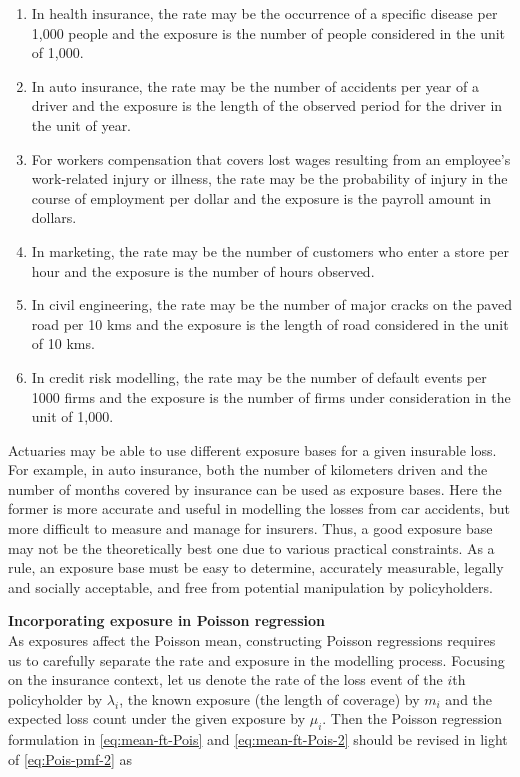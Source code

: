 \documentclass[]{book}
\providecommand{\tightlist}{%
  \setlength{\itemsep}{0pt}\setlength{\parskip}{0pt}}
\theoremstyle{definition}
\theoremstyle{definition}
\theoremstyle{definition}
\theoremstyle{remark}
\begin{document}
\begin{enumerate}
\def\labelenumi{\arabic{enumi}.}
\tightlist
\item
  In health insurance, the rate may be the occurrence of a specific
  disease per 1,000 people and the exposure is the number of people
  considered in the unit of 1,000.
\item
  In auto insurance, the rate may be the number of accidents per year of
  a driver and the exposure is the length of the observed period for the
  driver in the unit of year.\\
\item
  For workers compensation that covers lost wages resulting from an
  employee's work-related injury or illness, the rate may be the
  probability of injury in the course of employment per dollar and the
  exposure is the payroll amount in dollars.
\item
  In marketing, the rate may be the number of customers who enter a
  store per hour and the exposure is the number of hours observed.\\
\item
  In civil engineering, the rate may be the number of major cracks on
  the paved road per 10 kms and the exposure is the length of road
  considered in the unit of 10 kms.\\
\item
  In credit risk modelling, the rate may be the number of default events
  per 1000 firms and the exposure is the number of firms under
  consideration in the unit of 1,000.
\end{enumerate}

Actuaries may be able to use different exposure bases for a given
insurable loss. For example, in auto insurance, both the number of
kilometers driven and the number of months covered by insurance can be
used as exposure bases. Here the former is more accurate and useful in
modelling the losses from car accidents, but more difficult to measure
and manage for insurers. Thus, a good exposure base may not be the
theoretically best one due to various practical constraints. As a rule,
an exposure base must be easy to determine, accurately measurable,
legally and socially acceptable, and free from potential manipulation by
policyholders.

\textbf{Incorporating exposure in Poisson regression}\\
As exposures affect the Poisson mean, constructing Poisson regressions
requires us to carefully separate the rate and exposure in the modelling
process. Focusing on the insurance context, let us denote the rate of
the loss event of the \(i\)th policyholder by \(\lambda_i\), the known
exposure (the length of coverage) by \(m_i\) and the expected loss count
under the given exposure by \(\mu_i\). Then the Poisson regression
formulation in \eqref{eq:mean-ft-Pois} and \eqref{eq:mean-ft-Pois-2} should
be revised in light of \eqref{eq:Pois-pmf-2} as
\end{document}
